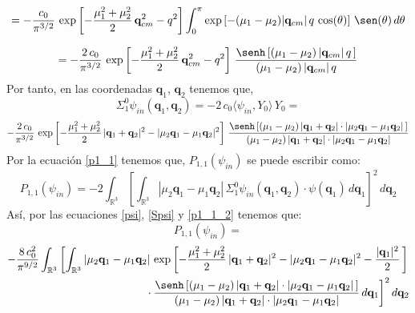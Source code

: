 \documentclass[12pt]{book}
\numberwithin{equation}{chapter}
\def\q{\mathbf{q}}
\def\R{\mathbb{R}}
\def\la{\langle}
\def\ra{\rangle}
\begin{document}
$$= -\frac{c_{0}}{\pi^{3/2}}\, \exp \left[ -\frac{\mu_{1}^{2}+\mu_{2}^{2}}{2}\, \q_{cm}^{2} - q^{2} \right] \int_{0}^{\pi} \exp \left[ -(\mu_{1} - \mu_{2}) |\q_{cm}|\, q \, \cos (\theta) \right] \, \sen(\theta)\, d\theta $$

$$ = -\frac{2\,c_{0}}{\pi^{3/2}}\, \exp \left[ -\frac{\mu_{1}^{2}+\mu_{2}^{2}}{2}\, \q_{cm}^{2} - q^{2} \right]\, \frac{ \senh \left[ (\mu_{1}-\mu_{2})\, |\q_{cm}|\, q \, \right]}{ (\mu_{1}-\mu_{2})\, |\q_{cm}|\, q} $$
Por tanto, en las coordenadas $\q_{1}$, $\q_{2}$ tenemos que,
$$\Sigma_{1}^{0} \psi_{in}(\q_{1},\q_{2})= -2\,c_{0} \la \psi_{in},Y_{0} \ra \, Y_{0}= $$
\begin{equation}\label{Spsi}
-\frac{2\,c_{0}}{\pi^{3/2}}\, \exp \left[ -\frac{\mu_{1}^{2}+\mu_{2}^{2}}{2}\, |\q_{1}+\q_{2}|^{2} - |\mu_{2}\q_{1}-\mu_{1}\q_{2}|^{2} \right]\, \frac{ \senh \left[ (\mu_{1}-\mu_{2})\, |\q_{1}+\q_{2}|\cdot |\mu_{2}\q_{1}-\mu_{1}\q_{2}| \, \right]}{ (\mu_{1}-\mu_{2})\, |\q_{1}+\q_{2}|\cdot |\mu_{2}\q_{1}-\mu_{1}\q_{2}| }
\end{equation}
Por la ecuaci\'on \eqref{p1_1} tenemos que, $P_{1,1}(\psi_{in})$ se puede escribir como:
\begin{equation}\label{p1_1_2}
P_{1,1}(\psi_{in})= -2 \int_{\R^{3}} \left[ \int_{\R^{3}} |\mu_{2}\q_{1}-\mu_{1}\q_{2}|\, \Sigma_{1}^{0} \psi_{in}(\q_{1},\q_{2})\cdot \psi (\q_{1})\, d\q_{1} \right]^{2} \, d\q_{2}
\end{equation}
As\'i, por las ecuaciones \eqref{psi}, \eqref{Spsi} y \eqref{p1_1_2} tenemos que:
$$P_{1,1}(\psi_{in})= $$
\begin{align}\label{p11exp}
-\frac{8\,c_{0}^{2}}{\pi^{9/2}} \int_{\R^{3}} \left[ \int_{\R^{3}}
|\mu_{2}\q_{1}-\mu_{1}\q_{2}|\, \exp \left[ -\frac{\mu_{1}^{2}+\mu_{2}^{2}}{2}\, |\q_{1}+\q_{2}|^{2} - |\mu_{2}\q_{1}-\mu_{1}\q_{2}|^{2}-\frac{|\q_{1}|^{2}}{2}\, \right]
\right.
\nonumber\\
\qquad \left. \vphantom{\int_{\R^{2}}}
\cdot \frac{ \senh \left[ (\mu_{1}-\mu_{2})\, |\q_{1}+\q_{2}|\cdot |\mu_{2}\q_{1}-\mu_{1}\q_{2}| \, \right]}{ (\mu_{1}-\mu_{2})\, |\q_{1}+\q_{2}|\cdot |\mu_{2}\q_{1}-\mu_{1}\q_{2}| }
\,d\q_{1} \right]^{2} d\q_{2}
\end{align}
\end{document}
